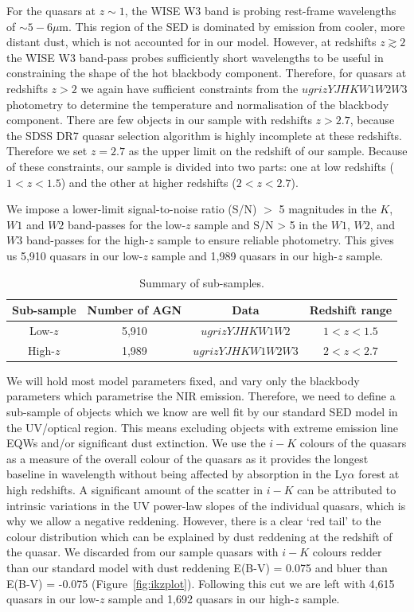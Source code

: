 For the quasars at $z \sim 1$, the WISE W3 band is probing rest-frame wavelengths of $\sim5-6\mu$m. 
This region of the SED is dominated by emission from cooler, more distant dust, which is not accounted for in our model.
However, at redshifts $z \gtrsim 2$ the WISE W3 band-pass probes sufficiently short wavelengths to be useful in constraining the shape of the hot blackbody component. 
Therefore, for quasars at redshifts $z > 2$ we again have sufficient constraints from the $ugrizYJHKW1W2W3$ photometry to determine the temperature and normalisation of the blackbody component. 
There are few objects in our sample with redshifts $z > 2.7$, because the SDSS DR7 quasar selection algorithm is highly incomplete at these redshifts.  
Therefore we set $z=2.7$ as the upper limit on the redshift of our sample. 
Because of these constraints, our sample is divided into two parts: one at low redshifts ($1 < z < 1.5$) and the other at higher redshifts ($2 < z < 2.7$). 

We impose a lower-limit signal-to-noise ratio (S/N) $>$ 5 magnitudes in the $K$, $W1$ and $W2$ band-passes for the low-$z$ sample and S/N > 5 in the $W1$, $W2$, and $W3$ band-passes for the high-$z$ sample to ensure reliable photometry.
This gives us 5,910 quasars in our low-$z$ sample and 1,989 quasars in our high-$z$ sample. 

\begin{table}
  \small
  \centering
  \begin{tabular}{cccc}
    \hline 
    Sub-sample & Number of AGN & Data & Redshift range \\
    \hline 
    Low-$z$ & 5,910 & $ugrizYJHKW1W2$ & $1 < z < 1.5$ \\
    High-$z$ & 1,989 & $ugrizYJHKW1W2W3$ & $2 < z < 2.7$ \\           
    \hline
  \end{tabular}
  \caption{Summary of sub-samples.}
  \label{tab:sub-samples}
\end{table}


We will hold most model parameters fixed, and vary only the blackbody parameters which parametrise the NIR emission. 
Therefore, we need to define a sub-sample of objects which we know are well fit by our standard SED model in the UV/optical region. 
This means excluding objects with extreme emission line EQWs and/or significant dust extinction.
We use the $i-K$ colours of the quasars as a measure of the overall colour of the quasars as it provides the longest baseline in wavelength without being affected by absorption in the Ly$\alpha$ forest at high redshifts. 
A significant amount of the scatter in $i-K$ can be attributed to intrinsic variations in the UV power-law slopes of the individual quasars, which is why we allow a negative reddening. 
However, there is a clear `red tail' to the colour distribution which can be explained by dust reddening at the redshift of the quasar.
We discarded from our sample quasars with $i - K$ colours redder than our standard model with dust reddening E(B-V) = 0.075 and bluer than E(B-V) = -0.075 (Figure~\ref{fig:ikzplot}). 
Following this cut we are left with 4,615 quasars in our low-$z$ sample and 1,692 quasars in our high-$z$ sample. 


